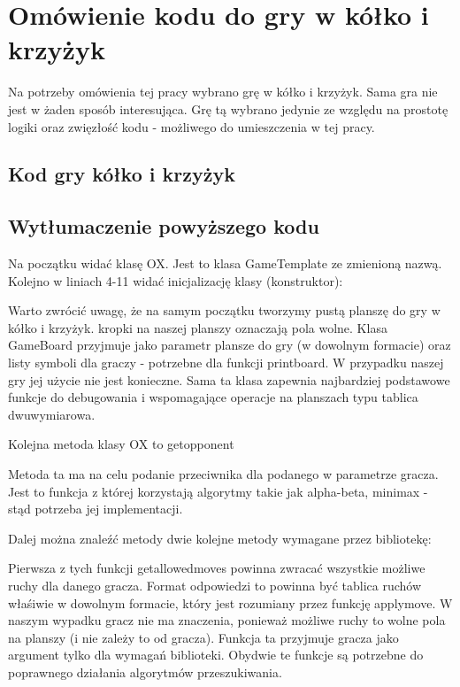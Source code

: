 \documentclass[polish,shortabstract,inz]{iithesis}
\begin{document}
\section{Omówienie kodu do gry w kółko i krzyżyk}
Na potrzeby omówienia tej pracy wybrano grę w kółko i krzyżyk.
Sama gra nie jest w żaden sposób interesująca.
Grę tą wybrano jedynie ze względu na prostotę logiki oraz zwięzłość kodu - możliwego do umieszczenia w tej pracy.
\subsection{Kod gry kółko i krzyżyk}

\subsection{Wytłumaczenie powyższego kodu}
Na początku widać klasę OX. Jest to klasa GameTemplate ze zmienioną nazwą.
Kolejno w liniach 4-11 widać inicjalizację klasy (konstruktor):

Warto zwrócić uwagę, że na samym początku tworzymy pustą planszę do gry w kółko i krzyżyk.
kropki na naszej planszy oznaczają pola wolne.
Klasa GameBoard przyjmuje jako parametr plansze do gry (w dowolnym formacie) oraz listy symboli dla graczy - potrzebne dla funkcji print\textunderscore board.
W przypadku naszej gry jej użycie nie jest konieczne.
Sama ta klasa zapewnia najbardziej podstawowe funkcje do debugowania i wspomagające operacje na planszach typu tablica dwuwymiarowa.

Kolejna metoda klasy OX to get\textunderscore opponent

Metoda ta ma na celu podanie przeciwnika dla podanego w parametrze gracza.
Jest to funkcja z której korzystają algorytmy takie jak alpha-beta, minimax - stąd potrzeba jej implementacji.

Dalej można znaleźć metody dwie kolejne metody wymagane przez bibliotekę:


Pierwsza z tych funkcji get\textunderscore allowed\textunderscore moves powinna zwracać wszystkie możliwe ruchy dla danego gracza.
Format odpowiedzi to powinna być tablica ruchów właśiwie w dowolnym formacie, który jest rozumiany przez funkcję apply\textunderscore move.
W naszym wypadku gracz nie ma znaczenia, ponieważ możliwe ruchy to wolne pola na planszy (i nie zależy to od gracza).
Funkcja ta przyjmuje gracza jako argument tylko dla wymagań biblioteki.
Obydwie te funkcje są potrzebne do poprawnego działania algorytmów przeszukiwania.
\end{document}
